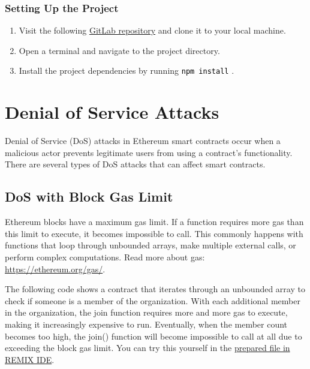 \documentclass[12pt]{article}
\newcommand{\codegrey}[1]{%
  \texttt{\colorbox{black!4}{\textcolor{black}{#1}}}%
}
\begin{document}
\subsubsection*{Setting Up the Project}

\begin{enumerate}
    \item Visit the following \href{https://gitlab.fel.cvut.cz/radovluk/smart-contracts-exercises/-/tree/main/07-Out-of-Gas/task/task-code}{GitLab repository} and clone it to your local machine.
    \item Open a terminal and navigate to the project directory.
    \item Install the project dependencies by running \codegrey{npm install}.
\end{enumerate}

\section{Denial of Service Attacks}

Denial of Service (DoS) attacks in Ethereum smart contracts occur when a malicious actor prevents legitimate users from using a contract's functionality. There are several types of DoS attacks that can affect smart contracts.

\subsection{DoS with Block Gas Limit}

Ethereum blocks have a maximum gas limit. If a function requires more gas than this limit to execute, it becomes impossible to call. This commonly happens with functions that loop through unbounded arrays, make multiple external calls, or perform complex computations. Read more about gas: \href{https://ethereum.org/gas/}{https://ethereum.org/gas/}.

The following code shows a contract that iterates through an unbounded array to check if someone is a member of the organization. With each additional member in the organization, the join function requires more and more gas to execute, making it increasingly expensive to run. Eventually, when the member count becomes too high, the join() function will become impossible to call at all due to exceeding the block gas limit. You can try this yourself in the \href{https://remix.ethereum.org/?#activate=solidity&url=https://github.com/radovluk/unbreakable-vault/contracts/DoS01.sol&lang=en&optimize=false&runs=200&evmVersion=null&version=soljson-v0.8.28+commit.7893614a.js}{prepared file in REMIX IDE}.
\end{document}
